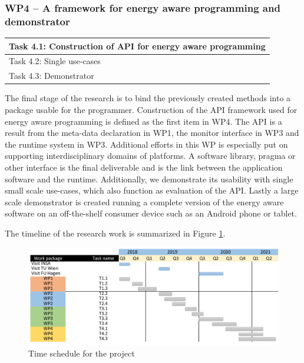 \documentclass{article}
\begin{document}
\subsubsection{WP4 -- A framework for energy aware programming and demonstrator}
\begin{table}
\vspace{-0.5cm}
\small
\begin{tabular}{ | l |}
\hline
Task 4.1: Construction of API for energy aware programming\\ \hline
Task 4.2: Single use-cases \\ \hline
Task 4.3: Demonstrator\\ \hline
\end{tabular}
\vspace{-0.3cm}
\end{table}
The final stage of the research is to bind the previously created methods into a package usable for the programmer.
Construction of the API framework used for energy aware programming is defined as the first item in WP4.
The API is a result from the meta-data declaration in WP1, the monitor interface in WP3 and the runtime system in WP3.
Additional efforts in this WP is especially put on supporting interdisciplinary domains of platforms.
A software library, pragma or other interface is the final deliverable and is the link between the application software and the runtime.
Additionally, we demonstrate its usability with single small scale use-cases, which also function as evaluation of the API.
Lastly a large scale demonstrator is created running a complete version of the energy aware software on an off-the-shelf consumer device such as an Android phone or tablet.

The timeline of the research work is summarized in Figure \ref{fig:schedule}.
\begin{figure}[h]
	\centering
	\includegraphics[scale=0.8]{fig/schedule.png}
	\caption{Time schedule for the project}
	\label{fig:schedule}
\end{figure}
\end{document}
